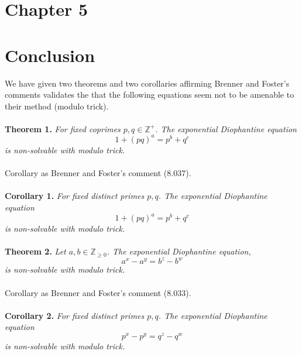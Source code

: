 \documentclass[12pt]{article}
\begin{document}
\begin{center}
    \section*{Chapter 5}
    \section*{Conclusion}
\end{center}
\hspace{0.5cm} We have given two theorems and two corollaries affirming Brenner and Foster’s comments validates the \cite{eDe} that the following equations seem not to be amenable to their method (modulo trick).  \\\\
\textbf{Theorem 1.}  \textit{For fixed coprimes $p,q\in\mathbb{Z}^+$. The exponential Diophantine equation}
    \[1+(pq)^a = p^b +q^c\]
\textit{is non-solvable with modulo trick.} \\\\
Corollary as Brenner and Foster’s comment (8.037). \\\\
\textbf{Corollary 1.}  \textit{For fixed distinct primes $p,q$. The exponential Diophantine equation}
    \[1+(pq)^a = p^b +q^c\]
\textit{is non-solvable with modulo trick.} \\\\
\textbf{Theorem 2.}  \textit{Let $a,b \in \mathbb{Z}_{\geq 0}$. The exponential Diophantine equation,}
    \[a^x-a^y = b^z-b^w \]
    \textit{is non-solvable with modulo trick.} \\\\
Corollary as Brenner and Foster’s comment (8.033). \\\\
\textbf{Corollary 2.}  \textit{For fixed distinct primes $p,q$. The exponential Diophantine equation}
    \[p^x-p^y = q^z-q^w \]
\textit{is non-solvable with modulo trick.}
\end{document}
